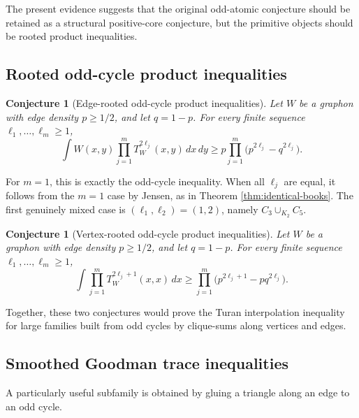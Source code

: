 \documentclass[11pt]{article}
\newtheorem{conjecture}[theorem]{Conjecture}
\theoremstyle{definition}
\begin{document}
The present evidence suggests that the original odd-atomic conjecture should be retained as a structural positive-core conjecture, but the primitive objects should be rooted product inequalities.

\subsection{Rooted odd-cycle product inequalities}

\begin{conjecture}[Edge-rooted odd-cycle product inequalities]\label{conj:edge-rooted-products}
Let $W$ be a graphon with edge density $p\ge1/2$, and let $q=1-p$.  For every finite sequence $\ell_1,\dots,\ell_m\ge1$,
\begin{equation}\label{eq:edge-rooted-product-conj}
  \int W(x,y)\prod_{j=1}^m T_W^{2\ell_j}(x,y)\,dx\,dy
  \ge
  p\prod_{j=1}^m\bigl(p^{2\ell_j}-q^{2\ell_j}\bigr).
\end{equation}
\end{conjecture}

For $m=1$, this is exactly the odd-cycle inequality.  When all $\ell_j$ are equal, it follows from the $m=1$ case by Jensen, as in Theorem \ref{thm:identical-books}.  The first genuinely mixed case is $(\ell_1,\ell_2)=(1,2)$, namely $C_3\cup_{K_2}C_5$.

\begin{conjecture}[Vertex-rooted odd-cycle product inequalities]\label{conj:vertex-rooted-products}
Let $W$ be a graphon with edge density $p\ge1/2$, and let $q=1-p$.  For every finite sequence $\ell_1,\dots,\ell_m\ge1$,
\begin{equation}\label{eq:vertex-rooted-product-conj}
  \int \prod_{j=1}^m T_W^{2\ell_j+1}(x,x)\,dx
  \ge
  \prod_{j=1}^m\bigl(p^{2\ell_j+1}-p q^{2\ell_j}\bigr).
\end{equation}
\end{conjecture}

Together, these two conjectures would prove the Turan interpolation inequality for large families built from odd cycles by clique-sums along vertices and edges.

\subsection{Smoothed Goodman trace inequalities}

A particularly useful subfamily is obtained by gluing a triangle along an edge to an odd cycle.
\end{document}
